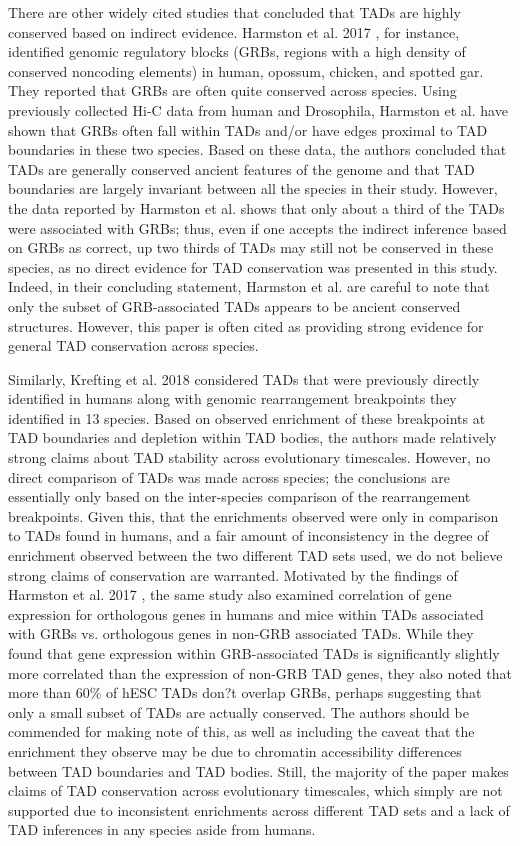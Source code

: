 There are other widely cited studies that concluded that TADs are highly conserved based on indirect evidence. Harmston et al. 2017 \cite{Harmston.2017}, for instance, identified genomic regulatory blocks (GRBs, regions with a high density of conserved noncoding elements) in human, opossum, chicken, and spotted gar. They reported that GRBs are often quite conserved across species. Using previously collected Hi-C data from human and Drosophila, Harmston et al. have shown that GRBs often fall within TADs and/or have edges proximal to TAD boundaries in these two species. Based on these data, the authors concluded that TADs are generally conserved ancient features of the genome and that TAD boundaries are largely invariant between all  the species in their study. However, the data reported by Harmston et al. shows that only about a third of the TADs were associated with GRBs; thus, even if one accepts the indirect inference based on GRBs as correct, up two thirds of TADs may still not be conserved in these species, as no direct evidence for TAD conservation was presented in this study. Indeed, in their concluding statement, Harmston et al. are careful to note that only the subset of GRB-associated TADs appears to be ancient conserved structures. However, this paper is often cited as providing strong evidence for general TAD conservation across species.  

Similarly, Krefting et al. 2018 \cite{Krefting.2018} considered TADs that were previously directly identified in humans \cite{Dixon.2012, Rao.2014} along with genomic rearrangement breakpoints they identified in 13 species. Based on observed enrichment of these breakpoints at TAD boundaries and depletion within TAD bodies, the authors made relatively strong claims about TAD stability across evolutionary timescales. However, no direct comparison of TADs was made across species; the conclusions are essentially only based on the inter-species comparison of the rearrangement breakpoints. Given this, that the enrichments observed were only in comparison to TADs found in humans, and a fair amount of inconsistency in the degree of enrichment observed between the two different TAD sets used, we do not believe strong claims of conservation are warranted. Motivated by the findings of Harmston et al. 2017 \cite{Harmston.2017}, the same study also examined correlation of gene expression for orthologous genes in humans and mice within TADs associated with GRBs vs. orthologous genes in non-GRB associated TADs. While they found that gene expression within GRB-associated TADs is significantly slightly more correlated than the expression of non-GRB TAD genes, they also noted that more than 60\% of hESC TADs don?t overlap GRBs, perhaps suggesting that only a small subset of TADs are actually conserved. The authors should be commended for making note of this, as well as including the caveat that the enrichment they observe may be due to chromatin accessibility differences between TAD boundaries and TAD bodies. Still, the majority of the paper makes claims of TAD conservation across evolutionary timescales, which simply are not supported due to inconsistent enrichments across different TAD sets and a lack of TAD inferences in any species aside from humans.

